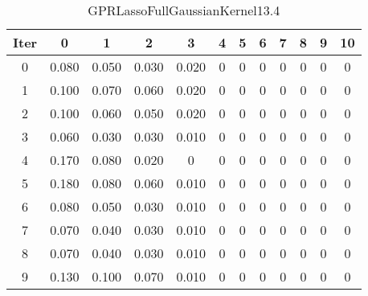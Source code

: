 \begin{table}
	\begin{center}
		\begin{tabular}{|c|c|c|c|c|c|c|c|c|c|c|c|}
			\hline
			Iter & 0 & 1 & 2 & 3 & 4 & 5 & 6 & 7 & 8 & 9 & 10 \\
			\hline
			0 & 0.080 & 0.050 & 0.030 & 0.020 & 0 & 0 & 0 & 0 & 0 & 0 & 0 \\
			\hline
			1 & 0.100 & 0.070 & 0.060 & 0.020 & 0 & 0 & 0 & 0 & 0 & 0 & 0 \\
			\hline
			2 & 0.100 & 0.060 & 0.050 & 0.020 & 0 & 0 & 0 & 0 & 0 & 0 & 0 \\
			\hline
			3 & 0.060 & 0.030 & 0.030 & 0.010 & 0 & 0 & 0 & 0 & 0 & 0 & 0 \\
			\hline
			4 & 0.170 & 0.080 & 0.020 & 0 & 0 & 0 & 0 & 0 & 0 & 0 & 0 \\
			\hline
			5 & 0.180 & 0.080 & 0.060 & 0.010 & 0 & 0 & 0 & 0 & 0 & 0 & 0 \\
			\hline
			6 & 0.080 & 0.050 & 0.030 & 0.010 & 0 & 0 & 0 & 0 & 0 & 0 & 0 \\
			\hline
			7 & 0.070 & 0.040 & 0.030 & 0.010 & 0 & 0 & 0 & 0 & 0 & 0 & 0 \\
			\hline
			8 & 0.070 & 0.040 & 0.030 & 0.010 & 0 & 0 & 0 & 0 & 0 & 0 & 0 \\
			\hline
			9 & 0.130 & 0.100 & 0.070 & 0.010 & 0 & 0 & 0 & 0 & 0 & 0 & 0 \\
			\hline
		\end{tabular}
	\end{center}
	\caption{GPRLassoFullGaussianKernel13.4}
\end{table}